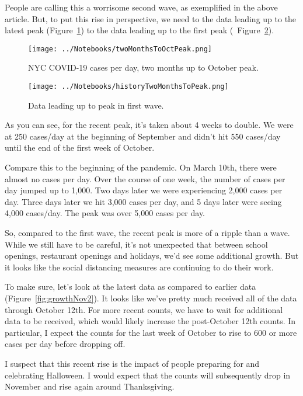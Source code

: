 \documentclass[10pt,reqno]{amsart}
\begin{document}
People are calling this a worrisome second wave, as exemplified in the
above article.  But, to put this rise in perspective, we need to the
data leading up to the latest peak (Figure~\ref{fig:secondPeak}) to
the data leading up to the first peak (~Figure~\ref{fig:firstPeak}).

\begin{figure}[h!tbp]
  \centering
  \texttt{[image: ../Notebooks/twoMonthsToOctPeak.png]}
  \caption{NYC COVID-19 cases per day, two months up to October peak.}
  \label{fig:secondPeak}
\end{figure}

\begin{figure}[h!btp]
  \centering
  \texttt{[image: ../Notebooks/historyTwoMonthsToPeak.png]}
  \caption{Data leading up to peak in first wave.}
  \label{fig:firstPeak}
\end{figure}

As you can see, for the recent peak, it's taken about 4 weeks to
double.  We were at 250 cases/day at the beginning of September and
didn't hit 550 cases/day until the end of the first week of October.

Compare this to the beginning of the pandemic.  On March 10th, there
were almost no cases per day.  Over the course of one week, the number
of cases per day jumped up to 1,000.  Two days later we were
experiencing 2,000 cases per day.  Three days later we hit 3,000
cases per day, and 5 days later were seeing 4,000 cases/day.  The peak
was over 5,000 cases per day.

So, compared to the first wave, the recent peak is more of a ripple
than a wave.  While we still have to be careful, it's not unexpected
that between school openings, restaurant openings and holidays, we'd
see some additional growth.  But it looks like the social distancing
measures are continuing to do their work.

To make sure, let's look at the latest data as compared to
earlier data (Figure~\ref{fig:growthNov2}).  It looks like we've
pretty much received all of the data through October 12th.  For more
recent counts, we have to wait for additional data to be received,
which would likely increase the post-October 12th counts.  In
particular, I expect the counts for the last week of October to rise
to 600 or more cases per day before dropping off.

I suspect that this recent rise is the impact of people
preparing for and celebrating Halloween.  I would expect that the
counts will subsequently drop in November and rise again around
Thanksgiving.
\end{document}
